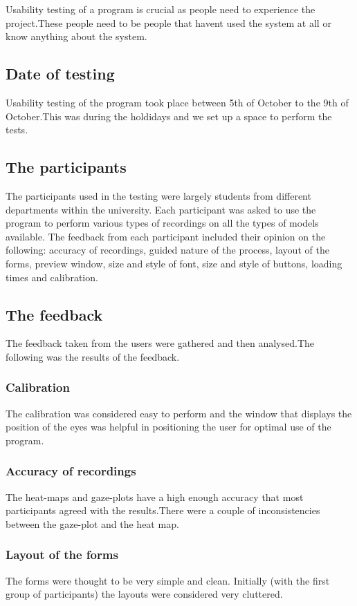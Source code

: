 Usability testing of a program is crucial as people need to experience the project.These people need to be people that havent used the system at all or know anything about the system.

\subsection{Date of testing}
Usability testing of the program took place between 5th of October to the 9th of October.This was during the holdidays and we set up a space to perform the tests.

\subsection{The participants}
The participants used in the testing were largely students from different departments within the university. Each participant was asked to use the program to perform various types of recordings on all the types of models available. The feedback from each participant included their opinion on the following: accuracy of recordings, guided nature of the process, layout of the forms, preview window, size and style of font, size and style of buttons, loading times and calibration.

\subsection{The feedback}
The feedback taken from the users were gathered and then analysed.The following was the results of the feedback.

\subsubsection{Calibration}
The calibration was considered easy to perform and the window that displays the position of the eyes was helpful in positioning the user for optimal use of the program.

\subsubsection{Accuracy of recordings}
The heat-maps and gaze-plots have a high enough accuracy that most participants agreed with the results.There were a couple of inconsistencies between the gaze-plot and the heat map.

\subsubsection{Layout of the forms}
The forms were thought to be very simple and clean. Initially (with the first group of participants) the layouts were considered very cluttered.

